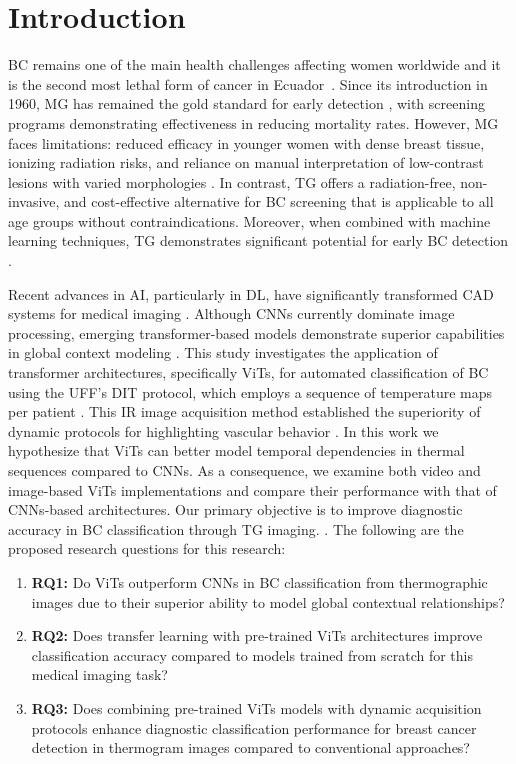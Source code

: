\documentclass[runningheads]{llncs}
\begin{document}
\section{Introduction}
\label{sec:introduction}
\ac{BC} remains one of the main health challenges affecting women
worldwide and it is the second most lethal form of cancer in
Ecuador~\cite{GLOBOCAN}. Since its introduction in 1960, \ac{MG} has
remained the gold standard for early detection
\cite{Kennedy2009,tsietso2022review}, with screening programs
demonstrating effectiveness in reducing mortality rates. However,
\ac{MG} faces limitations: reduced efficacy in younger women with
dense breast tissue, ionizing radiation risks, and reliance on manual
interpretation of low-contrast lesions with varied morphologies
\cite{Liu2023,Su2022}. In contrast, \ac{TG} offers a radiation-free,
non-invasive, and cost-effective alternative for \ac{BC} screening
that is applicable to all age groups without
contraindications. Moreover, when combined with machine learning
techniques, \ac{TG} demonstrates significant potential for early BC
detection \cite{Rakhunde2022}.

Recent advances in \ac{AI}, particularly in \ac{DL}, have
significantly transformed \ac{CAD} systems for medical imaging
\cite{Litjens2017}. Although \ac{CNNs} currently dominate image
processing, emerging transformer-based models demonstrate superior
capabilities in global context modeling
\cite{dosovitskiy2020image}. This study investigates the application
of transformer architectures, specifically \ac{ViTs}, for automated
classification of \ac{BC} using the UFF's \ac{DIT} protocol, which
employs a sequence of temperature maps per patient
\cite{VisualLab2014}. This \ac{IR} image acquisition method
established the superiority of dynamic protocols for highlighting
vascular behavior \cite{Silva2014}. In this work we hypothesize that
\ac{ViTs} can better model temporal dependencies in thermal sequences
compared to \ac{CNNs}. As a consequence, we examine both video and
image-based \ac{ViTs} implementations and compare their performance
with that of \ac{CNNs}-based architectures. Our primary objective is
to improve diagnostic accuracy in \ac{BC} classification through
\ac{TG} imaging. . The following are the proposed research questions
for this research:

\begin{enumerate}
\item \textbf{RQ1:} Do \ac{ViTs} outperform \ac{CNNs} in \ac{BC}
  classification from thermographic images due to their superior
  ability to model global contextual relationships?

\item \textbf{RQ2:} Does transfer learning with pre-trained \ac{ViTs}
  architectures improve classification accuracy compared to models
  trained from scratch for this medical imaging task?

\item \textbf{RQ3:} Does combining pre-trained \ac{ViTs} models with
  dynamic acquisition protocols enhance diagnostic classification
  performance for breast cancer detection in thermogram images
  compared to conventional approaches?
\end{enumerate}
\end{document}
